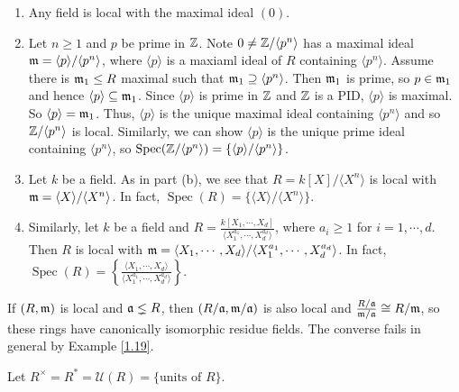 \begin{example}\label{1.19}
    \begin{enumerate}
        \item Any field is local with the maximal ideal $(0)$.
        \item Let $n \geq 1$ and $p$ be prime in $\mathbb{Z}$. Note $0 \neq \mathbb{Z}/\langle p^n \rangle$ has a maximal ideal $\mathfrak{m} = \langle p \rangle/\langle p^n \rangle$, where $\langle p \rangle$ is a maxiaml ideal of $R$ containing $\langle p^n \rangle$. Assume there is $\mathfrak{m}_1 \leq R$ maximal such that $\mathfrak{m}_1 \supseteq \langle p^n \rangle$. Then $\mathfrak{m}_1$ is prime, so $p \in \mathfrak{m}_1$ and hence $\langle p \rangle \subseteq \mathfrak{m}_1$. Since $\langle p \rangle$ is prime in $\mathbb{Z}$ and $\mathbb{Z}$ is a PID, $\langle p \rangle$ is maximal. So $\langle p \rangle = \mathfrak{m}_1$. Thus, $\langle p \rangle$ is the unique maximal ideal containing $\langle p^n \rangle$ and so $\mathbb{Z}/\langle p^n \rangle$ is local. Similarly, we can show $\langle p \rangle$ is the unique prime ideal containing $\langle p^n \rangle$, so $\operatorname{Spec}(\mathbb{Z}/\langle p^n \rangle) = \left\{\langle p \rangle/\langle p^n \rangle\right\}$. 
        \item Let $k$ be a field. As in part (b), we see that $R = k[X]/\langle X^n \rangle$ is local with $\mathfrak{m} = \langle X \rangle / \langle X^n \rangle$. In fact, $\operatorname{Spec}(R) = \{\langle X \rangle/\langle X^n \rangle\}$.
        \item Similarly, let $k$ be a field and $R = \frac{k[X_1,\cdots,X_d]}{\langle X_1^{a_1}, \cdots, X_d^{a_d}\rangle}$, where $a_i \geq 1$ for $i = 1,\cdots,d$. Then $R$ is local with $\mathfrak{m} = \langle X_1,\cdots,X_d\rangle/\langle X_1^{a_1},\cdots,X_d^{a_d} \rangle$. In fact, $\operatorname{Spec}(R) = \left\{\frac{\langle X_1,\cdots,X_d\rangle}{\langle X_1^{a_1}, \cdots, X_d^{a_d}\rangle}\right\}$.
    \end{enumerate}
\end{example}

\begin{fact}\label{1.20}
    If $(R,\mathfrak{m})$ is local and $\mathfrak{a} \lneq R$, then $(R/\mathfrak{a},\mathfrak{m}/\mathfrak{a})$ is also local and $\frac{R/\mathfrak{a}}{\mathfrak{m}/\mathfrak{a}} \cong R/\mathfrak{m}$, so these rings have canonically isomorphic residue fields. The converse fails in general by Example \ref{1.19}. 
\end{fact}

\begin{notation}\label{1.21}
    Let $R^\times = R^* =  \mathcal U(R) = \{\text{units of }R\}$.
\end{notation}

